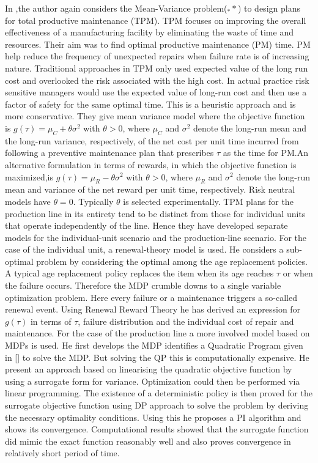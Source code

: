 \documentclass[11pt,a4paper,oneside]{report}
\begin{document}
In \cite{gosavi2006risk},the author again considers the Mean-Variance problem($_**$) to design plans for total productive maintenance (TPM). TPM  focuses on improving the overall effectiveness of a manufacturing facility by eliminating the waste of time and resources. Their aim was to find optimal productive maintenance (PM) time. PM help reduce the frequency of unexpected repairs when failure rate is of increasing nature. Traditional approaches in TPM only used expected value of the long run cost and overlooked the risk associated with the high cost. In actual practice risk sensitive managers would use the expected value of long-run cost and then use a factor of safety for the same optimal time. This is a heuristic approach and is more conservative. They give mean variance model where the objective function is $g(\tau)= \mu_C+ \theta {\sigma}^2$ with $\theta>0$, where $\mu_C$ and $\sigma^2$ denote the long-run mean and the long-run variance, respectively, of the net cost per unit time incurred from following a preventive maintenance plan that prescribes $\tau$ as the time for PM.An alternative formulation in terms of rewards, in which the objective function is maximized,is $g(\tau)= \mu_R- \theta {\sigma}^2$ with $\theta>0$, where $\mu_R$ and $\sigma^2$ denote the long-run mean and variance of the net reward per unit time, respectively. Risk neutral models have $\theta =0$. Typically $\theta$ is selected experimentally. TPM plans for the production line in its entirety tend to be distinct from those for individual units that operate independently of the line. Hence they have developed separate models for the individual-unit scenario and the production-line scenario. For the case of the individual unit, a renewal-theory model is used. He considers a sub-optimal problem by considering the optimal among the age replacement policies. A typical age replacement policy replaces the item when its age reaches $\tau$ or when the failure occurs. Therefore the MDP crumble downs to a single variable optimization problem. Here every failure or a maintenance triggers a so-called renewal event. Using Renewal Reward Theory he has derived an expression for $g(\tau)$ in terms of $\tau$, failure distribution and the individual cost of repair and maintenance. For the case of the production line a more involved model based on MDPs is used. He first develops the MDP identifies a Quadratic Program given in [] to solve the MDP. But solving the QP this is computationally expensive. He present an approach based on linearising the quadratic objective function by using a surrogate form for variance. Optimization could then be performed via linear programming. The existence of a deterministic policy is then proved for the surrogate objective function using DP approach to solve the problem by deriving the necessary optimality conditions. Using this he proposes a PI algorithm and shows its convergence. Computational results showed that the surrogate function did mimic the exact function reasonably well and also proves convergence in relatively short period of time.\\
\end{document}

